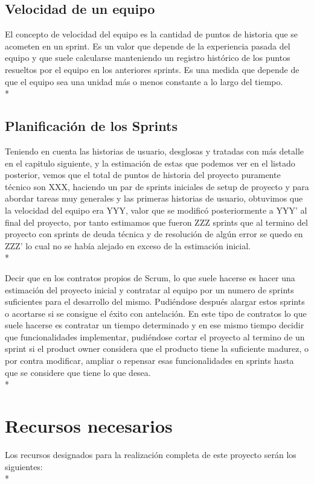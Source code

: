 \documentclass[../pfc.tex]{subfiles}
\begin{document}
	\subsection{Velocidad de un equipo}
	
	El concepto de velocidad del equipo es la cantidad de puntos de historia que se acometen en un sprint. Es un valor que depende de la experiencia pasada del equipo y que suele calcularse manteniendo un registro histórico de los puntos resueltos por el equipo en los anteriores sprints. Es una medida que depende de que el equipo sea una unidad más o menos constante a lo largo del tiempo.\\*
	
	\subsection{Planificación de los Sprints}   
	
	Teniendo en cuenta las historias de usuario, desglosas y tratadas con más detalle en el capitulo siguiente, y la estimación de estas que podemos ver en el listado posterior, vemos que el total de puntos de historia del proyecto puramente técnico son XXX, haciendo un par de sprints iniciales de setup de proyecto y para abordar tareas muy generales y las primeras historias de usuario, obtuvimos que la velocidad del equipo era YYY, valor que se modificó posteriormente a YYY' al final del proyecto, por tanto estimamos que fueron ZZZ sprints que al termino del proyecto con sprints de deuda técnica y de resolución de algún error se quedo en ZZZ' lo cual no se había alejado en exceso de la estimación inicial. \\*
	
	Decir que en los contratos propios de Scrum, lo que suele hacerse es hacer una estimación del proyecto inicial y contratar al equipo por un numero de sprints suficientes para el desarrollo del mismo. Pudiéndose después alargar estos sprints o acortarse si se consigue el éxito con antelación. En este tipo de contratos lo que suele hacerse es contratar un tiempo determinado y en ese mismo tiempo decidir que funcionalidades implementar, pudiéndose cortar el proyecto al termino de un sprint si el product owner considera que el producto tiene la suficiente madurez, o por contra modificar, ampliar o repensar esas funcionalidades en sprints hasta que se considere que tiene lo que desea. \\*
	
	
	\section{Recursos necesarios}
	Los recursos designados para la realización completa de este proyecto serán los siguientes:\\*
	
\end{document}
